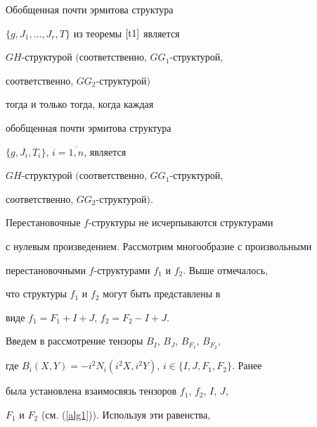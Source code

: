 \begin{thm}\label{2}














Обобщенная почти эрмитова структура


$\{g,J_1,\dotsc,J_r,T\}$ из теоремы $\ref{t1}$ является


$GH$-структурой $($соответственно, $GG_1$-структурой,


соответственно, $GG_2$-струк\-ту\-рой$)$


тогда и только тогда, когда каждая


обобщенная почти эрмитова структура


$\{g,J_i,T_i\}$, $i=\overline{1,n}$, является


$GH$-структурой $($соответственно, $GG_1$-структурой,


соответственно, $GG_2$-структурой$)$.


\end{thm}





Перестановочные $f$-структуры не исчерпываются структурами


с нулевым произведением. Рассмотрим многообразие с произвольными


перестановочными $f$-структурами $f_1$ и $f_2$. Выше отмечалось,


что структуры $f_1$ и $f_2$ могут быть представлены в 


виде $f_1=F_1+I+J$, $f_2=F_2-I+J$.





Введем в рассмотрение тензоры $B_I$, $B_J$, $B_{F_1}$, $B_{F_2}$,


где $B_i(X,Y)=-i^2N_i(i^2X,i^2Y)$, $i\in\{I,J,F_1,F_2\}$. Ранее


была установлена взаимосвязь тензоров $f_1$, $f_2$, $I$, $J$,


$F_1$ и $F_2$ (см. (\ref{alg1})). Используя эти равенства,


